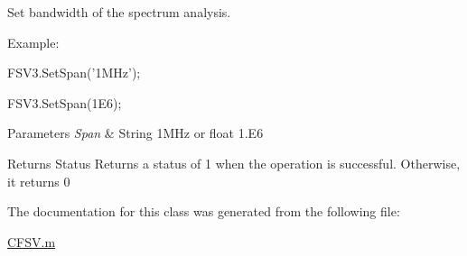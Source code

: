 Set bandwidth of the spectrum analysis. 

Example\-:\par
 F\-S\-V3.\-Set\-Span('1\-M\-Hz');\par
 F\-S\-V3.\-Set\-Span(1\-E6); 
\begin{DoxyParams}{Parameters}
{\em Span} & String 1\-M\-Hz or float 1.\-E6 \\
\hline
\end{DoxyParams}
\begin{DoxyReturn}{Returns}
Status Returns a status of 1 when the operation is successful. Otherwise, it returns 0 
\end{DoxyReturn}


The documentation for this class was generated from the following file\-:\begin{DoxyCompactItemize}
\item 
\hyperlink{_c_f_s_v_8m}{C\-F\-S\-V.\-m}\end{DoxyCompactItemize}
